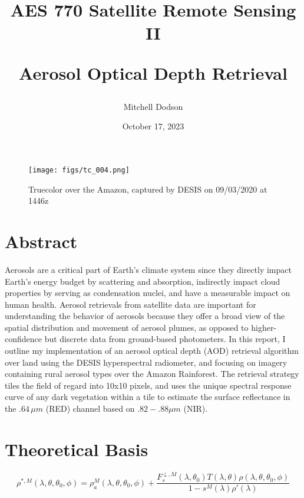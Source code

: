 \documentclass[12pt]{article}
\title{AES 770 Satellite Remote Sensing II

Aerosol Optical Depth Retrieval}
\author{Mitchell Dodson}
\date{October 17, 2023}
\begin{document}
\maketitle

\vspace{-2em}

\begin{figure}[h!]
    \centering
    \texttt{[image: figs/tc\_004.png]}
    \caption{Truecolor over the Amazon, captured by DESIS on 09/03/2020 at 1446z}
    \label{title_image}
\end{figure}

\section{Abstract}

Aerosols are a critical part of Earth's climate system since they directly impact Earth's energy budget by scattering and absorption, indirectly impact cloud properties by serving as condensation nuclei, and have a measurable impact on human health. Aerosol retrievals from satellite data are important for understanding the behavior of aerosols because they offer a broad view of the spatial distribution and movement of aerosol plumes, as opposed to higher-confidence but discrete data from ground-based photometers. In this report, I outline my implementation of an aerosol optical depth (AOD) retrieval algorithm over land using the DESIS hyperspectral radiometer, and focusing on imagery containing rural aerosol types over the Amazon Rainforest. The retrieval strategy tiles the field of regard into 10x10 pixels, and uses the unique spectral response curve of any dark vegetation within a tile to estimate the surface reflectance in the $.64\,\si{\mu m}$ (RED) channel based on $.82-.88\mu m$ (NIR).


\section{Theoretical Basis}

\begin{equation}\label{toa_ref}
    \rho^{*,M}(\lambda, \theta, \theta_0, \phi) = \rho_a^M(\lambda, \theta, \theta_0, \phi) + \frac{F_s^{\downarrow,M}(\lambda, \theta_0)T(\lambda, \theta)\rho(\lambda, \theta, \theta_0, \phi)}{1-s^M(\lambda)\rho'(\lambda)}
\end{equation}
\end{document}
